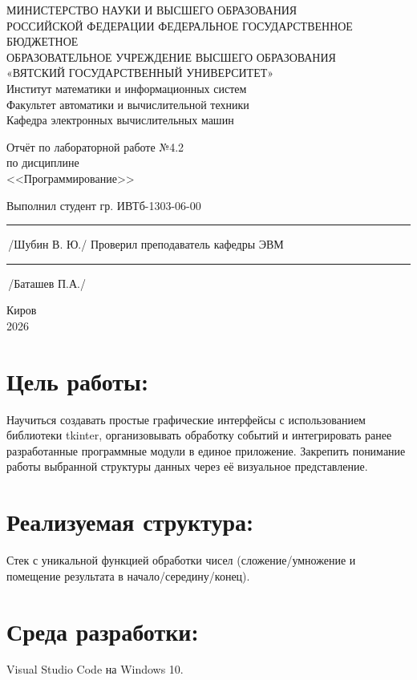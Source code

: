 \documentclass[oneside,a4paper,14pt]{extarticle} %
\begin{document}
	\newpage\thispagestyle{empty}
	\begin{center}
		МИНИСТЕРСТВО НАУКИ И ВЫСШЕГО ОБРАЗОВАНИЯ\\
		РОССИЙСКОЙ ФЕДЕРАЦИИ
		ФЕДЕРАЛЬНОЕ ГОСУДАРСТВЕННОЕ БЮДЖЕТНОЕ\\
		ОБРАЗОВАТЕЛЬНОЕ
		УЧРЕЖДЕНИЕ ВЫСШЕГО ОБРАЗОВАНИЯ\\
		«ВЯТСКИЙ ГОСУДАРСТВЕННЫЙ УНИВЕРСИТЕТ»\\
		Институт математики и информационных систем\\
		Факультет автоматики и вычислительной техники\\
		Кафедра электронных вычислительных машин
	\end{center}
	\vspace{20mm}
	
	\begin{center}
		Отчёт по лабораторной работе №4.2\\
		по дисциплине\\
		<<Программирование>>\\
	\end{center}
	\vspace{48mm}
	
	\noindent
	Выполнил студент гр. ИВТб-1303-06-00 \hfill \rule[-0,5mm]{30mm}{0.15mm}\,/Шубин В. Ю./
	\newline
	Проверил преподаватель кафедры ЭВМ \hfill \rule[-0,5mm]{30mm}{0.15mm}\,/Баташев П.А./
	
	\vfill
	\begin{center}
		Киров\\
		2026
	\end{center}
	
	\newpage
	\thispagestyle{empty}
	
	\section*{Цель работы:} Научиться создавать простые графические интерфейсы с использованием библиотеки tkinter, организовывать обработку событий и интегрировать ранее разработанные программные модули в единое приложение. Закрепить понимание работы выбранной структуры данных через её визуальное представление.
	\section*{Реализуемая структура:} Стек с уникальной функцией обработки чисел (сложение/умножение и помещение результата в начало/середину/конец).
	\section*{Среда разработки:} Visual Studio Code на Windows 10.
	\newpage
	
\end{document}
